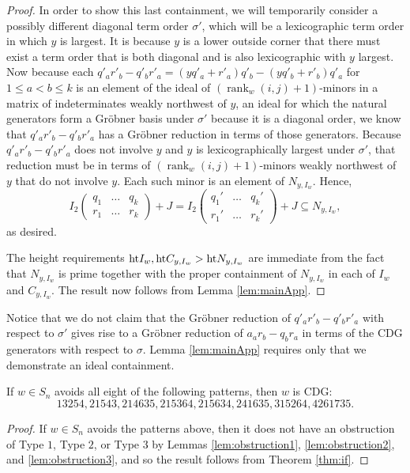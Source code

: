 \documentclass[ALCO,Unicode,published]{cedram}
\DeclareMathOperator{\rank}{rank}
\newcommand{\hgt}{{\rm{ht }}}
\begin{document}
\begin{proof}
In order to show this last containment, we will temporarily consider a possibly different diagonal term order $\sigma'$, which will be a lexicographic term order in which $y$ is largest.  It is because $y$ is a lower outside corner that there must exist a term order that is both diagonal and is also lexicographic with $y$ largest.  Now because each $q'_ar'_b-q'_br'_a = (yq'_a+r'_a)q'_b-(yq'_b+r'_b)q'_a$ for $1 \leq a<b \leq k$ is an element of the ideal of  $(\rank_w(i,j)+1)$-minors in a matrix of indeterminates weakly northwest of $y$, an ideal for which the natural generators form a Gr\"obner basis under $\sigma'$ because it is a diagonal order, we know that $q'_ar'_b-q'_br'_a$ has a Gr\"obner reduction in terms of those generators.  Because $q'_ar'_b-q'_br'_a$ does not involve $y$ and $y$ is lexicographically largest under $\sigma'$, that reduction must be in terms of $(\rank_w(i,j)+1)$-minors weakly northwest of $y$ that do not involve $y$.  Each such minor is an element of $N_{y,I_w}$.  Hence, \[
I_2 \begin{pmatrix} q_1 & \ldots & q_k \\ r_1 & \ldots & r_k \end{pmatrix}+J = I_2 \begin{pmatrix} q_1' & \ldots & q_k' \\ r_1' & \ldots & r_k' \end{pmatrix}+J \subseteq N_{y,I_w},
\] as desired. 

The height requirements $\hgt{I_w}, \hgt{C_{y,I_w}} > \hgt{N_{y,I_w}}$ are immediate from the fact that $N_{y,I_w}$ is prime \cite[Proposition 3.3]{Ful92} together with the proper containment of $N_{y,I_w}$ in each of $I_w$ and $C_{y,I_w}$.  The result now follows from Lemma \ref{lem:mainApp}.
\end{proof}

Notice that we do not claim that the Gr\"obner reduction of $q'_ar'_b-q'_br'_a$ with respect to $\sigma'$ gives rise to a Gr\"obner reduction of $a_ar_b-q_br_a$ in terms of the CDG generators with respect to $\sigma$.  Lemma \ref{lem:mainApp} requires only that we demonstrate an ideal containment.

\begin{corollary}\label{cor:mainIf}
If $w \in S_n$ avoids all eight of the following patterns, then $w$ is CDG: \[
13254, 21543, 214635, 215364, 215634, 241635, 315264, 4261735.
\]
\end{corollary}
\begin{proof}
If $w \in S_n$ avoids the patterns above, then it does not have an obstruction of Type $1$, Type  $2$, or Type $3$ by Lemmas \ref{lem:obstruction1}, \ref{lem:obstruction2}, and \ref{lem:obstruction3}, and so the result follows from Theorem \ref{thm:if}.
\end{proof}
\end{document}
